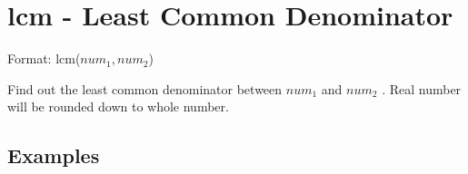 
%

\section{lcm - Least Common Denominator\label{sect:lcm}}

Format: lcm($num_1,num_2$)

Find out the least common denominator between $num_1$ and $num_2$ .  Real number will be rounded down to whole number.


\subsection*{Examples}


%


